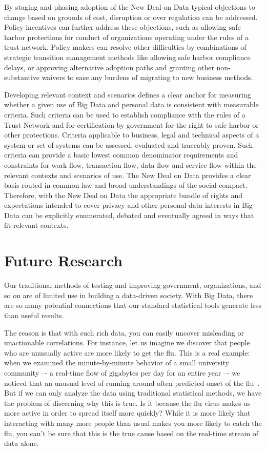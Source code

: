 By staging and phasing adoption of the New Deal on Data typical objections to change based on grounds of cost, disruption or over regulation can be addressed.
Policy incentives can further address these objections, such as allowing safe harbor protections for conduct of organizations operating under the rules of a trust network.
Policy makers can resolve other difficulties by combinations of strategic transition management methods like allowing safe harbor compliance delays, or approving alternative adoption paths and granting other non-substantive waivers to ease any burdens of migrating to new business methods.   
 
 
Developing relevant context and scenarios defines a clear anchor for measuring whether a given use of Big Data and personal data is consistent with measurable criteria.  Such criteria can be used to establish compliance with the rules of a Trust Network and for certification by government for the right to safe harbor or other protections.  Criteria applicable to business, legal and technical aspects of a system or set of systems can be assessed, evaluated and traceably proven. Such criteria can provide a basic lowest common denominator requirements and constraints for work flow, transaction flow, data flow and service flow within the relevant contexts and scenarios of use.  The New Deal on Data provides a clear basis routed in common law and broad understandings of the social compact.  Therefore, with the New Deal on Data the appropriate bundle of rights and expectations intended to cover privacy and other personal data interests in Big Data can be explicitly enumerated, debated and eventually agreed in ways that fit relevant contexts.  


\section{Future Research }

Our traditional methods of testing and improving government, organizations, and so on are of limited use in building a data-driven society.  With Big Data, there are so many potential connections that our standard statistical tools generate less than useful results.  

The reason is that with such rich data, you can easily uncover misleading or unactionable correlations.
For instance, let us imagine we discover that people who are unusually active are more likely to get the flu.
This is a real example: when we examined the minute-by-minute behavior of a small university community –- a real-time flow of gigabytes per day for an entire year –- we noticed that an unusual level of running around often predicted onset of the flu~\cite{madan2010social}.
But if we can only analyze the data using traditional statistical methods, we have the problem of discerning why this is true.
Is it because the flu virus makes us more active in order to spread itself more quickly?
While it is more likely that interacting with many more people than usual makes you more likely to catch the flu, you can't be sure that this is the true cause based on the real-time stream of data alone.


